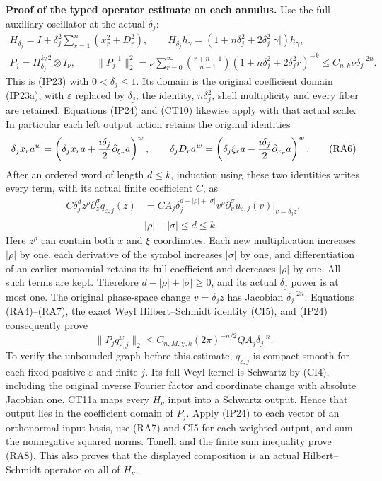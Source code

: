 \documentclass[
  11pt,
]{article}
\begin{document}
\textbf{Proof of the typed operator estimate on each annulus.} Use the
full auxiliary oscillator at the actual \(\delta_j\): \[
\begin{gathered}
 H_{\delta_j}=I+\delta_j^2\sum_{r=1}^n(x_r^2+D_r^2),\qquad
 H_{\delta_j}h_\gamma
       =(1+n\delta_j^2+2\delta_j^2|\gamma|)h_\gamma,\\
 P_j=H_{\delta_j}^{k/2}\otimes I_\nu,
 \qquad
 \|P_j^{-1}\|_2^2
   =\nu\sum_{r=0}^\infty\binom{r+n-1}{n-1}
                     (1+n\delta_j^2+2\delta_j^2r)^{-k}
   \leq C_{n,k}\nu\delta_j^{-2n}.
\end{gathered}
\tag{RA5}
\] This is (IP23) with \(0<\delta_j\leq1\). Its domain is the original
coefficient domain (IP23a), with \(\varepsilon\) replaced by
\(\delta_j\); the identity, \(n\delta_j^2\), shell multiplicity and
every fiber are retained. Equations (IP24) and (CT10) likewise apply
with that actual scale. In particular each left output action retains
the original identities \[
 \delta_j x_r a^w
   =\left(\delta_j x_r a+
                  {i\delta_j\over2}\partial_{\xi_r}a\right)^w,
 \qquad
 \delta_j D_r a^w
   =\left(\delta_j\xi_r a-
                  {i\delta_j\over2}\partial_{x_r}a\right)^w.
 \tag{RA6}
\] After an ordered word of length \(d\leq k\), induction using these
two identities writes every term, with its actual finite coefficient
\(C\), as \[
\begin{aligned}
 C\delta_j^d z^\rho\partial_z^\sigma q_{\varepsilon,j}(z)
 &=C A_j\delta_j^{d-|\rho|+|\sigma|}
          v^\rho\partial_v^\sigma u_{\varepsilon,j}(v)
                   \big|_{v=\delta_j z},\\
 &|\rho|+|\sigma|\leq d\leq k.
\end{aligned}
\tag{RA7}
\] Here \(z^\rho\) can contain both \(x\) and \(\xi\) coordinates. Each
new multiplication increases \(|\rho|\) by one, each derivative of the
symbol increases \(|\sigma|\) by one, and differentiation of an earlier
monomial retains its full coefficient and decreases \(|\rho|\) by one.
All such terms are kept. Therefore \(d-|\rho|+|\sigma|\geq0\), and its
actual \(\delta_j\) power is at most one. The original phase-space
change \(v=\delta_j z\) has Jacobian \(\delta_j^{-2n}\). Equations
(RA4)--(RA7), the exact Weyl Hilbert--Schmidt identity (CI5), and (IP24)
consequently prove \[
 \|P_j q_{\varepsilon,j}^w\|_2
       \leq C_{n,M,\chi,k}(2\pi)^{-n/2}
                         Q A_j\delta_j^{-n}.
 \tag{RA8}
\] To verify the unbounded graph before this estimate,
\(q_{\varepsilon,j}\) is compact smooth for each fixed positive
\(\varepsilon\) and finite \(j\). Its full Weyl kernel is Schwartz by
(CI4), including the original inverse Fourier factor and coordinate
change with absolute Jacobian one. CT11a maps every \(H_\nu\) input into
a Schwartz output. Hence that output lies in the coefficient domain of
\(P_j\). Apply (IP24) to each vector of an orthonormal input basis, use
(RA7) and CI5 for each weighted output, and sum the nonnegative squared
norms. Tonelli and the finite sum inequality prove (RA8). This also
proves that the displayed composition is an actual Hilbert--Schmidt
operator on all of \(H_\nu\).
\end{document}
